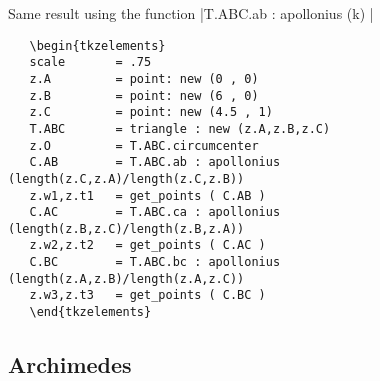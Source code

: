 \begin{center}
\end{center}



Same result using the function |T.ABC.ab : apollonius (k) |

\begin{Verbatim}
   \begin{tkzelements}
   scale       = .75
   z.A         = point: new (0 , 0)
   z.B         = point: new (6 , 0)
   z.C         = point: new (4.5 , 1)
   T.ABC       = triangle : new (z.A,z.B,z.C)
   z.O         = T.ABC.circumcenter
   C.AB        = T.ABC.ab : apollonius (length(z.C,z.A)/length(z.C,z.B))
   z.w1,z.t1   = get_points ( C.AB )
   C.AC        = T.ABC.ca : apollonius (length(z.B,z.C)/length(z.B,z.A))
   z.w2,z.t2   = get_points ( C.AC )
   C.BC        = T.ABC.bc : apollonius (length(z.A,z.B)/length(z.A,z.C))
   z.w3,z.t3   = get_points ( C.BC )
   \end{tkzelements}
\end{Verbatim}


\subsection{Archimedes} %
\label{sub:archimedes}

